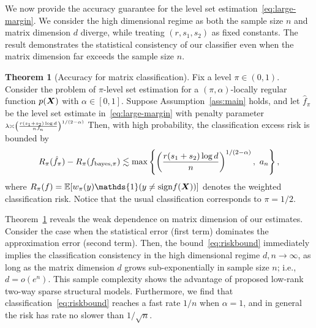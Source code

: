\documentclass[11pt]{article}
\theoremstyle{definition}
\newtheorem{thm}{Theorem}[section]
\def\sign{\textup{sign}}
\def\bayespif{f_{\textup{bayes},\pi}}
\begin{document}
We now provide the accuracy guarantee for the level set estimation~\eqref{eq:large-margin}. We consider the high dimensional regime as both the sample size $n$ and matrix dimension $d$ diverge, while treating $(r,s_1,s_2)$ as fixed constants. The result demonstrates the statistical consistency of our classifier even when the matrix dimension far exceeds the sample size $n$. 

\begin{thm}[Accuracy for matrix classification]\label{thm:main} Fix a level $\pi\in(0,1)$. Consider the problem of $\pi$-level set estimation for a $(\pi,\alpha)$-locally regular function $p(\bm X)$ with $\alpha\in[0,1]$. Suppose Assumption~\ref{ass:main} holds, and let $\hat f_\pi$ be the level set estimate in~\eqref{eq:large-margin} with penalty parameter $\scriptstyle\lambda\asymp \left( r( s_1+s_2)\log d \over  nJ_n\right)^{1/(2-\alpha)}$ Then, with high probability, the classification excess risk is bounded by 
\begin{equation}\label{eq:riskbound}
 R_{\pi}( \hat f_\pi)-R_{\pi}(\bayespif) \lesssim \max\left\{\left({r(s_1+s_2)\log d \over n}\right)^{1/(2-\alpha)},\ a_n\right\},
\end{equation}
where $R_{\pi}(f)=\mathbb{E}[w_\pi(y)\mathds{1}(y\neq \sign f(\mX))]$ denotes the weighted classification risk. Notice that the usual classification corresponds to $\pi = 1/2$. 

\end{thm}

Theorem~\ref{thm:main} reveals the weak dependence on matrix dimension of our estimates. Consider the case when the statistical error (first term) dominates the approximation error (second term). Then, the bound~\eqref{eq:riskbound} immediately implies the classification consistency in the high dimensional regime $d,n\to \infty$, as long as the matrix dimension $d$ grows sub-exponentially in sample size $n$; i.e., $d=o(e^n)$. This sample complexity shows the advantage of proposed low-rank two-way sparse structural models. Furthermore, we find that classification~\eqref{eq:riskbound} reaches a fast rate $1/n$ when $\alpha=1$, and in general the risk has rate no slower than $1/\sqrt{n}$. 
\end{document}

